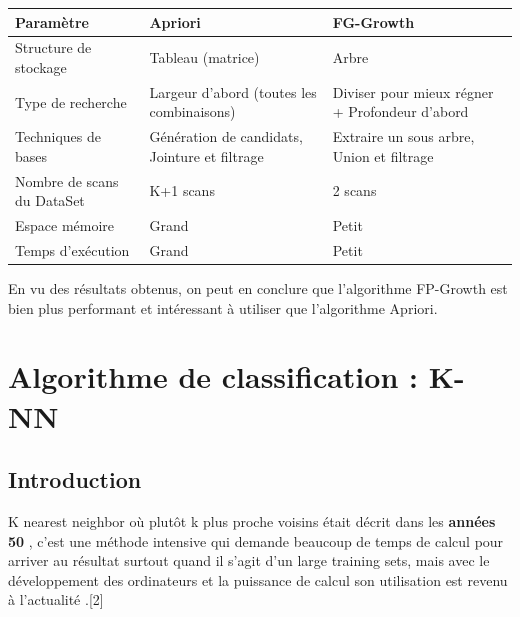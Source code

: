 \documentclass[12pt,a4paper,oneside]{book}
\begin{document}
	\begin{center}
		\begin{tabular}{|p{5cm}|p{5cm}|p{5cm}|}
			\hline
			\textbf{Paramètre} &
			\textbf{Apriori} &
			\textbf{FG-Growth} 
			\\
			\hline
			
			Structure de stockage &
			Tableau (matrice) &
			Arbre 
			\\
			\hline
			
			Type de recherche &
			Largeur d'abord (toutes les combinaisons) &
			Diviser pour mieux régner + Profondeur d'abord
			\\
			\hline
			
			Techniques de bases &
			Génération de candidats, Jointure et filtrage &
			Extraire un sous arbre, Union et filtrage
			\\
			\hline	
			
			Nombre de scans du DataSet &
			K+1 scans &
			2 scans
			\\
			\hline	
			
			Espace mémoire &
			Grand &
			Petit
			\\
			\hline
			
			Temps d'exécution &
			Grand &
			Petit
			\\
			\hline		
			
			
		\end{tabular} 
	\end{center}
	
	En vu des résultats obtenus, on peut en conclure que l'algorithme FP-Growth est bien plus performant et intéressant à utiliser que l'algorithme Apriori.
	
	\chapter{Algorithme de classification : K-NN}
	\section{Introduction}
	K nearest neighbor où plutôt k plus proche voisins était décrit dans les \textbf{années 50} , c'est une méthode intensive qui demande beaucoup de temps de calcul pour arriver au résultat surtout quand il s'agit d'un large training sets, mais avec le développement des ordinateurs et la puissance de calcul son utilisation est revenu à l'actualité .[2]
	
\end{document}
